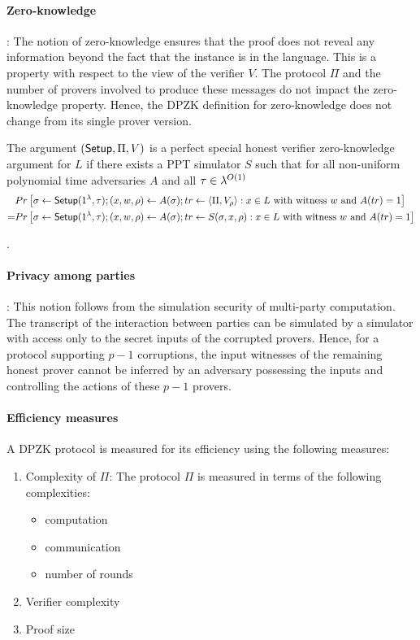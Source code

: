 \paragraph{Zero-knowledge}: 
The notion of zero-knowledge ensures that the proof does not reveal any information beyond the fact that the instance is in the language.
This is a property with respect to the view of the verifier $V$. The protocol $\Pi$ and the number of provers involved to produce these messages do not impact the zero-knowledge property. Hence, the DPZK definition for zero-knowledge does not change from its single prover version.
\begin{definition}
The argument $(\mathsf{Setup}, \Pi, V)$ is a perfect special honest verifier zero-knowledge argument for $L$ if there exists a PPT simulator $S$ such that for all non-uniform polynomial time adversaries $A$ and all $\tau \in {\lambda}^{O(1)}$ 
\begin{align*}
&Pr \left[ \sigma \leftarrow \mathsf{Setup}(1^{\lambda}, \tau); (x,w,\rho) \leftarrow A(\sigma); tr \leftarrow \langle \Pi, V_\rho \rangle: x \in L \text{ with witness } w \text{ and } A(tr)=1 \right] \\
= &Pr \left[\sigma \leftarrow \mathsf{Setup}(1^{\lambda}, \tau); (x,w,\rho) \leftarrow A(\sigma); tr \leftarrow S(\sigma,x,\rho): x \in L \text{ with witness } w \text{ and } A(tr) = 1 \right]
\end{align*}
\end{definition}
.

\paragraph{Privacy among parties}:
This notion follows from the simulation security of multi-party computation. The transcript of the interaction between parties can be simulated by a simulator with access only to the secret inputs of the corrupted provers. Hence, for a protocol supporting $p-1$ corruptions, the input witnesses of the remaining honest prover cannot be inferred by an adversary possessing the inputs and controlling the actions of these $p-1$ provers.

\paragraph{Efficiency measures}
A DPZK protocol is measured for its efficiency using the following measures:
\begin{enumerate}
\item Complexity of $\Pi$: The protocol $\Pi$ is measured in terms of the following complexities:
\begin{itemize}
\item computation
\item communication
\item number of rounds
\end{itemize}
\item Verifier complexity
\item Proof size
\end{enumerate}


